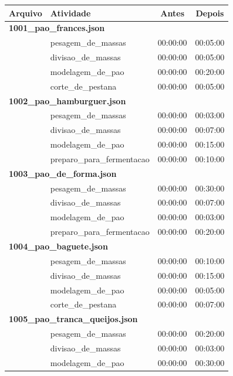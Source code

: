 \documentclass[12pt,a4paper]{article}
\begin{document}
\begin{longtable}{p{4.5cm}p{5.5cm}cc}
\toprule
\textbf{Arquivo} & \textbf{Atividade} & \textbf{Antes} & \textbf{Depois} \\
\midrule
\endhead

\multicolumn{4}{l}{\textbf{1001\_pao\_frances.json}} \\
& pesagem\_de\_massas & 00:00:00 & 00:05:00 \\
& divisao\_de\_massas & 00:00:00 & 00:05:00 \\
& modelagem\_de\_pao & 00:00:00 & 00:20:00 \\
& corte\_de\_pestana & 00:00:00 & 00:05:00 \\
\midrule

\multicolumn{4}{l}{\textbf{1002\_pao\_hamburguer.json}} \\
& pesagem\_de\_massas & 00:00:00 & 00:03:00 \\
& divisao\_de\_massas & 00:00:00 & 00:07:00 \\
& modelagem\_de\_pao & 00:00:00 & 00:15:00 \\
& preparo\_para\_fermentacao & 00:00:00 & 00:10:00 \\
\midrule

\multicolumn{4}{l}{\textbf{1003\_pao\_de\_forma.json}} \\
& pesagem\_de\_massas & 00:00:00 & 00:30:00 \\
& divisao\_de\_massas & 00:00:00 & 00:07:00 \\
& modelagem\_de\_pao & 00:00:00 & 00:03:00 \\
& preparo\_para\_fermentacao & 00:00:00 & 00:20:00 \\
\midrule

\multicolumn{4}{l}{\textbf{1004\_pao\_baguete.json}} \\
& pesagem\_de\_massas & 00:00:00 & 00:10:00 \\
& divisao\_de\_massas & 00:00:00 & 00:15:00 \\
& modelagem\_de\_pao & 00:00:00 & 00:05:00 \\
& corte\_de\_pestana & 00:00:00 & 00:07:00 \\
\midrule

\multicolumn{4}{l}{\textbf{1005\_pao\_tranca\_queijos.json}} \\
& pesagem\_de\_massas & 00:00:00 & 00:20:00 \\
& divisao\_de\_massas & 00:00:00 & 00:03:00 \\
& modelagem\_de\_pao & 00:00:00 & 00:30:00 \\
\midrule


\end{longtable}
\end{document}
